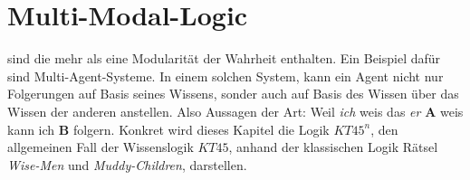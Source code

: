 

\chapter{Multi-Modal-Logic} %
\label{sec:multi_modal_logic}
\MML sind \NML die mehr als eine Modularität der Wahrheit enthalten.
Ein Beispiel dafür sind Multi-Agent-Systeme. 
In einem solchen System, kann ein Agent nicht nur Folgerungen auf Basis seines Wissens, sonder auch auf Basis des Wissen über das Wissen der anderen anstellen. Also Aussagen der Art: Weil \emph{ich} weis das \emph{er} \textbf{A} weis kann ich \textbf{B} folgern.
Konkret wird dieses Kapitel die Logik $KT45^n$, den allgemeinen Fall der Wissenslogik $KT45$, anhand der klassischen Logik Rätsel \emph{Wise-Men} und \emph{Muddy-Children}, darstellen.





